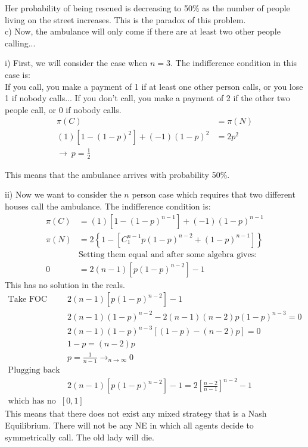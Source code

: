 \documentclass[letter,11pt]{article}
\begin{document}
Her probability of being rescued is decreasing to 50\% as the number of people living on the street increases. This is the paradox of this problem. \\

c) Now, the ambulance will only come if there are at least two other people calling... 

i) First, we will consider the case when $n=3$. The indifference condition in this case is: \\
If you call, you make a payment of 1 if at least one other person calls, or you lose 1 if nobody calls...
If you don't call, you make a payment of 2 if the other two people call, or 0 if nobody calls.
\begin{align*}
\pi(C) & = \pi(N) \\
(1) [1-(1-p)^2] + (-1)(1-p)^2 & = 2 p^2 \\
\rightarrow \ \boxed{p = \frac{1}{2}}
\end{align*}

This means that the ambulance arrives with probability 50\%. 

ii) Now we want to consider the $n$ person case which requires that two different houses call the ambulance. The indifference condition is:
\begin{align*}
\pi(C) &= (1) [1-(1-p)^{n-1}] + (-1)(1-p)^{n-1} \\
\pi(N) &= 2 \left\{ 1- [C_{1}^{n-1} p (1-p)^{n-2} + (1-p)^{n-1} ]  \right\} \\
& \text{Setting them equal and after some algebra gives: } \\
0 &= 2(n-1)[p(1-p)^{n-2}] - 1 
\end{align*}
This has no solution in the reals. 
\begin{align*}
\text{Take FOC with respect to p of: } \ & 2(n-1)[p(1-p)^{n-2}] - 1 \\
& 2(n-1)(1-p)^{n-2} - 2(n-1)(n-2)p(1-p)^{n-3} = 0 \\
& 2(n-1)(1-p)^{n-3}[(1-p) -(n-2)p] =0 \\
& 1-p =(n-2) p \\
& \boxed{p=\frac{1}{n-1} \rightarrow_{n\rightarrow \infty} 0} \\
\text{Plugging back the p we get: } & \\
& 2(n-1)[p(1-p)^{n-2}] - 1 = 2 \left[\frac{n-2}{n-1} \right]^{n-2} - 1 \\
\text{which has no roots in } [0,1]
\end{align*}
This means that there does not exist any mixed strategy that is a Nash Equilibrium. There will not be any NE in which all agents decide to symmetrically call. The old lady will die.
\end{document}
